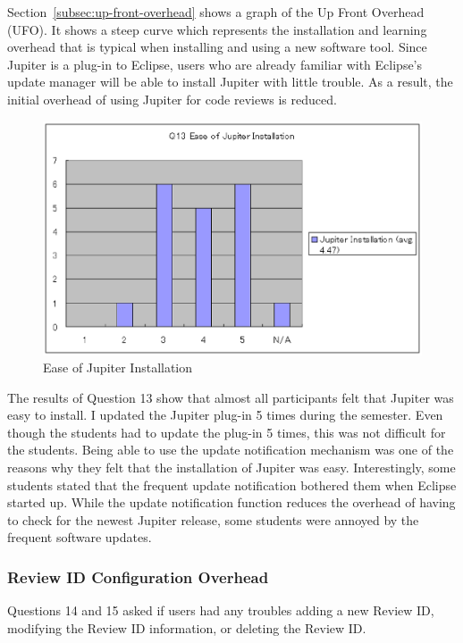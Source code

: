 Section~\ref{subsec:up-front-overhead} shows a graph of the Up Front Overhead (UFO). It shows a steep curve which represents the installation and learning overhead that is typical when installing and using a new software tool. Since Jupiter is a plug-in to Eclipse, users who are already familiar with Eclipse's update manager will be able to install Jupiter with little trouble. As a result, the initial overhead of using Jupiter for code reviews is reduced.

\begin{figure}[htbp]
  \centering
  \includegraphics{images/fig5-2.eps}
  \caption{Ease of Jupiter Installation}
  \label{fig5-2}
\end{figure}

The results of Question 13 show that almost all participants felt that Jupiter was easy to install. I updated the Jupiter plug-in 5 times during the semester. Even though the students had to update the plug-in 5 times, this was not difficult for the students. Being able to use the update notification mechanism was one of the reasons why they felt that the installation of Jupiter was easy. Interestingly, some students stated that the frequent update notification bothered them when Eclipse started up. While the update notification function reduces the overhead of having to check for the newest Jupiter release, some students were annoyed by the frequent software updates.

\subsubsection{Review ID Configuration Overhead}
\label{subsubsec:review-id-configuration-overhead}

Questions 14 and 15 asked if users had any troubles adding a new Review ID, modifying the Review ID information, or deleting the Review ID.

